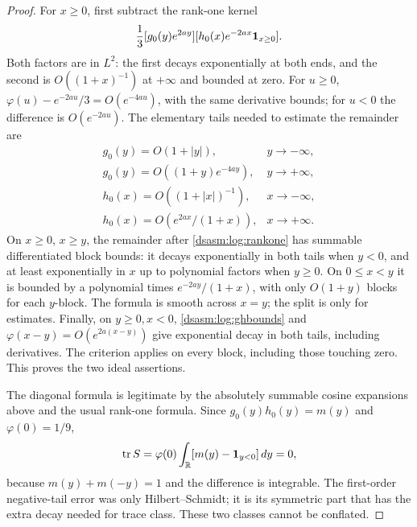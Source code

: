 \documentclass[11pt,letterpaper]{article}
\theoremstyle{remark}\newtheorem{remark}[theorem]{Remark}
\newcommand{\R}{\mathbb R}\newcommand{\C}{\mathbb C}\newcommand{\N}{\mathbb N}
\DeclareMathOperator{\tr}{tr}\DeclareMathOperator{\Ran}{Ran}
\begin{document}
\begin{proof}
For $x\ge0$, first subtract the rank-one kernel
\begin{equation}\label{dsasm:log:rankone}
 \frac13[g_0(y)e^{2ay}]
       [h_0(x)e^{-2ax}\mathbf1_{x\ge0}].
\end{equation}
Both factors are in $L^2$: the first decays exponentially at both
ends, and the second is $O((1+x)^{-1})$ at $+\infty$ and bounded
at zero. For $u\ge0$, $\varphi(u)-e^{-2au}/3=O(e^{-4au})$,
with the same derivative bounds; for $u<0$ the difference is
$O(e^{-2au})$. The elementary tails needed to estimate the remainder
are
\begin{equation}\label{dsasm:log:ghbounds}
\begin{array}{ll}
 g_0(y)=O(1+|y|),&y\to-\infty,\\
 g_0(y)=O((1+y)e^{-4ay}),&y\to+\infty,\\
 h_0(x)=O((1+|x|)^{-1}),&x\to-\infty,\\
 h_0(x)=O(e^{2ax}/(1+x)),&x\to+\infty.
\end{array}
\end{equation}
On $x\ge0$, $x\ge y$, the remainder after \eqref{dsasm:log:rankone} has
summable differentiated block bounds: it decays exponentially in
both tails when $y<0$, and at least exponentially in $x$ up to
polynomial factors when $y\ge0$. On $0\le x<y$ it is bounded by a
polynomial times $e^{-2ay}/(1+x)$, with only $O(1+y)$ blocks for
each $y$-block. The formula is smooth across $x=y$; the split is
only for estimates. Finally, on $y\ge0,x<0$, \eqref{dsasm:log:ghbounds}
and $\varphi(x-y)=O(e^{2a(x-y)})$ give exponential decay in both
tails, including derivatives. The criterion applies on every block,
including those touching zero. This proves the two ideal assertions.

The diagonal formula is legitimate by the absolutely summable cosine
expansions above and the usual rank-one formula. Since
$g_0(y)h_0(y)=m(y)$ and $\varphi(0)=1/9$,
\[
 \tr S=\varphi(0)\int_{\R}[m(y)-\one_{y<0}]\,dy=0,
\]
because $m(y)+m(-y)=1$ and the difference is integrable.
The first-order negative-tail error was only Hilbert--Schmidt;
it is its symmetric part that has the extra decay needed for trace
class. These two classes cannot be conflated.
\end{proof}
\end{document}
